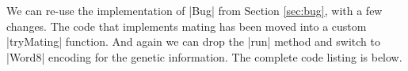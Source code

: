 We can re-use the implementation of |Bug| from Section \ref{sec:bug},
with a few changes.
The code that implements mating has been moved into a custom
|tryMating| function.
And again we can drop the |run| method and switch to |Word8| encoding
for the genetic information.
The complete code listing is below.


